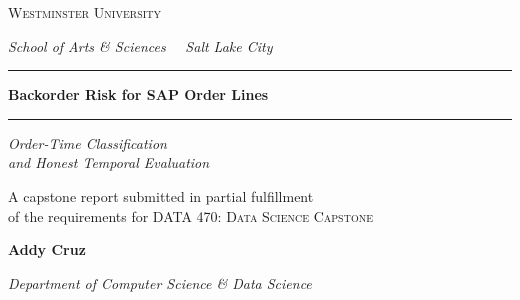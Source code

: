 \onecolumn
\thispagestyle{empty}

\begingroup
\setlength{\parindent}{0pt}
\setlength{\parskip}{0pt}
\centering

\vspace*{0.7in}

{\fontsize{12}{14}\selectfont
 \color{wuFlint}\textsc{Westminster University}\par}
\vspace{2pt}
{\fontsize{10}{12}\selectfont\itshape
 \color{wuFlint}School of Arts \& Sciences \, \textbar \, Salt Lake City\par}

\vspace{0.30in}
{\color{wuCopper}\rule{1.6in}{0.6pt}}

\vspace{1.20in}

{\fontsize{30}{36}\bfseries\selectfont
 \color{wuNight}Backorder Risk for SAP Order Lines\par}

\vspace{0.18in}
{\color{wuCopper}\rule{4.0in}{0.4pt}}
\vspace{0.18in}

{\fontsize{15}{20}\itshape\selectfont
 Order-Time Classification \\[2pt] and Honest Temporal Evaluation\par}

\vspace{0.95in}

{\fontsize{11}{14}\selectfont
 \color{wuFlint}A capstone report submitted in partial fulfillment\\
 of the requirements for \textsc{DATA 470: Data Science Capstone}\par}

\vspace{0.40in}

{\fontsize{16}{20}\bfseries\selectfont Addy Cruz\par}
\vspace{4pt}
{\fontsize{10.5}{13}\itshape\selectfont
 \color{wuFlint}Department of Computer Science \& Data Science\par}


